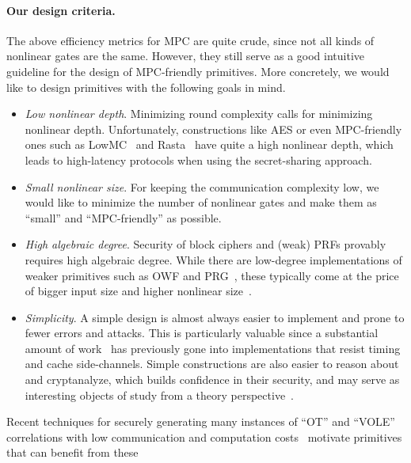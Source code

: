 \paragraph{Our design criteria.}  The above efficiency metrics for MPC are quite crude, since not all kinds of nonlinear gates are the same. However, they still serve as a good intuitive guideline for the design of MPC-friendly primitives. More concretely, we would like to design primitives with the following goals in mind.

\begin{itemize}[itemsep=1ex]
    \item \textit{Low nonlinear depth}. Minimizing round complexity calls for minimizing nonlinear depth. Unfortunately, constructions like AES or even MPC-friendly ones such as LowMC~\cite{albrecht2015-lowmc} and Rasta~\cite{cite} have quite a high nonlinear depth, which leads to high-latency protocols when using the secret-sharing approach.
    
\item \textit{Small nonlinear size}.
 For keeping the communication complexity low, we would like to minimize the number of nonlinear gates and make them as ``small'' and ``MPC-friendly'' as possible. 

\item \textit{High algebraic degree}.
Security of block ciphers and (weak) PRFs provably requires high algebraic degree. While there are low-degree implementations of weaker primitives such as OWF and PRG~\cite{MQref,Goldreich,ApplebaumIK04}, these typically come at the price of bigger input size and higher nonlinear size~\cite{couteau2018-goldreich-prg}.
    
    \item \textit{Simplicity}.  A simple design is almost always easier to implement and prone to fewer errors and attacks. This is particularly valuable since a substantial amount of work~\cite{?} has previously gone into implementations that resist timing and cache side-channels. Simple constructions are also easier to reason about and cryptanalyze, which builds confidence in their security, and may serve as interesting objects of study from a theory perspective~\cite{Goldreich,MilesViola,Akaviaetal}.
\end{itemize}

\iffalse     
    Recent techniques for securely generating many instances of ``OT'' and ``VOLE'' correlations  with low communication and computation costs~\cite{BCGI18,BCGKIS19,more} motivate primitives that can benefit from these
    
